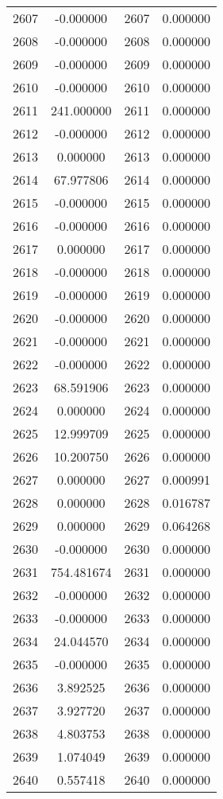 \documentclass[12pt]{article}
\begin{document}
\begin{longtable}{@{}cccc@{}}
2607 & -0.000000 & 2607 & 0.000000 \\
2608 & -0.000000 & 2608 & 0.000000 \\
2609 & -0.000000 & 2609 & 0.000000 \\
2610 & -0.000000 & 2610 & 0.000000 \\
2611 & 241.000000 & 2611 & 0.000000 \\
2612 & -0.000000 & 2612 & 0.000000 \\
2613 & 0.000000 & 2613 & 0.000000 \\
2614 & 67.977806 & 2614 & 0.000000 \\
2615 & -0.000000 & 2615 & 0.000000 \\
2616 & -0.000000 & 2616 & 0.000000 \\
2617 & 0.000000 & 2617 & 0.000000 \\
2618 & -0.000000 & 2618 & 0.000000 \\
2619 & -0.000000 & 2619 & 0.000000 \\
2620 & -0.000000 & 2620 & 0.000000 \\
2621 & -0.000000 & 2621 & 0.000000 \\
2622 & -0.000000 & 2622 & 0.000000 \\
2623 & 68.591906 & 2623 & 0.000000 \\
2624 & 0.000000 & 2624 & 0.000000 \\
2625 & 12.999709 & 2625 & 0.000000 \\
2626 & 10.200750 & 2626 & 0.000000 \\
2627 & 0.000000 & 2627 & 0.000991 \\
2628 & 0.000000 & 2628 & 0.016787 \\
2629 & 0.000000 & 2629 & 0.064268 \\
2630 & -0.000000 & 2630 & 0.000000 \\
2631 & 754.481674 & 2631 & 0.000000 \\
2632 & -0.000000 & 2632 & 0.000000 \\
2633 & -0.000000 & 2633 & 0.000000 \\
2634 & 24.044570 & 2634 & 0.000000 \\
2635 & -0.000000 & 2635 & 0.000000 \\
2636 & 3.892525 & 2636 & 0.000000 \\
2637 & 3.927720 & 2637 & 0.000000 \\
2638 & 4.803753 & 2638 & 0.000000 \\
2639 & 1.074049 & 2639 & 0.000000 \\
2640 & 0.557418 & 2640 & 0.000000 \\

\end{longtable}
\end{document}
